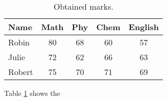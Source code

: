 \documentclass[a4paper]{article}
\begin{document}
\begin{table}[!hbt]
    \centering
    \caption{Obtained marks.}
    \label{tab-marks}
    \begin{tabular}{|l|c|c|c|c|}
    \hline Name & Math & Phy & Chem & English\\
    \hline Robin & 80 & 68 & 60 & 57\\
    \hline Julie & 72 & 62 & 66 & 63\\
    \hline Robert & 75 & 70 & 71 & 69\\
    \hline
    \end{tabular}
    \end{table}
    Table \ref{tab-marks} shows the 
\end{document}
